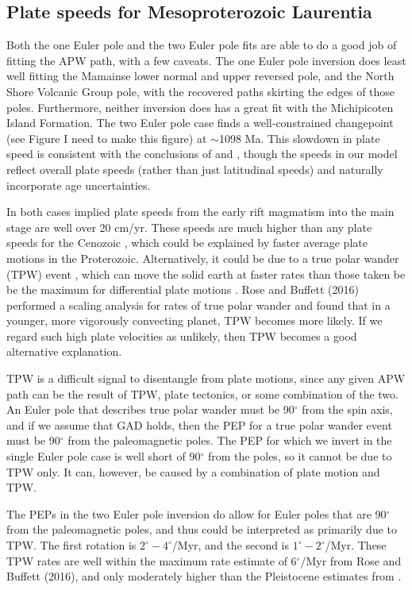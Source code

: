 \documentclass[preprint,12pt,authoryear]{elsarticle}
\begin{document}
\subsection{Plate speeds for Mesoproterozoic Laurentia}
\label{sec:laurentian_plate_speeds}
Both the one Euler pole and the two Euler pole fits are able to do a good job of fitting the APW path, with a few caveats.
The one Euler pole inversion does least well fitting the Mamainse lower normal and upper reversed pole,
and the North Shore Volcanic Group pole, with the recovered paths skirting the edges of those poles.
Furthermore, neither inversion does has a great fit with the Michipicoten Island Formation.
The two Euler pole case finds a well-constrained changepoint (see Figure I need to make this figure) at $\sim$1098 Ma.
This slowdown in plate speed is consistent with the conclusions of \citet{davis1997geochronology} 
and \citet{swanson2009no}, though the speeds in our model reflect overall plate speeds 
(rather than just latitudinal speeds) and naturally incorporate age uncertainties.

In both cases implied plate speeds from the early rift magmatism into the main stage are well over 20 cm/yr.
These speeds are much higher than any plate speeds for the Cenozoic \citep{zahirovic2015tectonic},
which could be explained by faster average plate motions in the Proterozoic.
Alternatively, it could be due to a true polar wander (TPW) event \citep{evans2003true, swanson2009no},
which can move the solid earth at faster rates than those taken be be the maximum
for differential plate motions \citep{cambiotti2011new}.
Rose and Buffett (2016) performed a scaling analysis for rates of true polar wander and 
found that in a younger, more vigorously convecting planet, TPW becomes more likely.
If we regard such high plate velocities as unlikely, then TPW becomes a good alternative explanation.

TPW is a difficult signal to disentangle from plate motions, since any given APW path
can be the result of TPW, plate tectonics, or some combination of the two.
An Euler pole that describes true polar wander must be 90$^\circ$ from the spin axis,
and if we assume that GAD holds, then the PEP for a true polar wander event must be
90$^\circ$ from the paleomagnetic poles. The PEP for which we invert in the single
Euler pole case is well short of 90$^\circ$ from the poles, so it cannot be due to TPW only.
It can, however, be caused by a combination of plate motion and TPW.

The PEPs in the two Euler pole inversion do allow for Euler poles that are 90$^\circ$ from
the paleomagnetic poles, and thus could be interpreted as primarily due to TPW.
The first rotation is $2^\circ-4^\circ$/Myr, and the second is $1^\circ-2^\circ$/Myr.
These TPW rates are well within the maximum rate estimate of 6$^\circ$/Myr from Rose and Buffett (2016),
and only moderately higher than the Pleistocene estimates from \citet{cambiotti2011new}.
\end{document}
